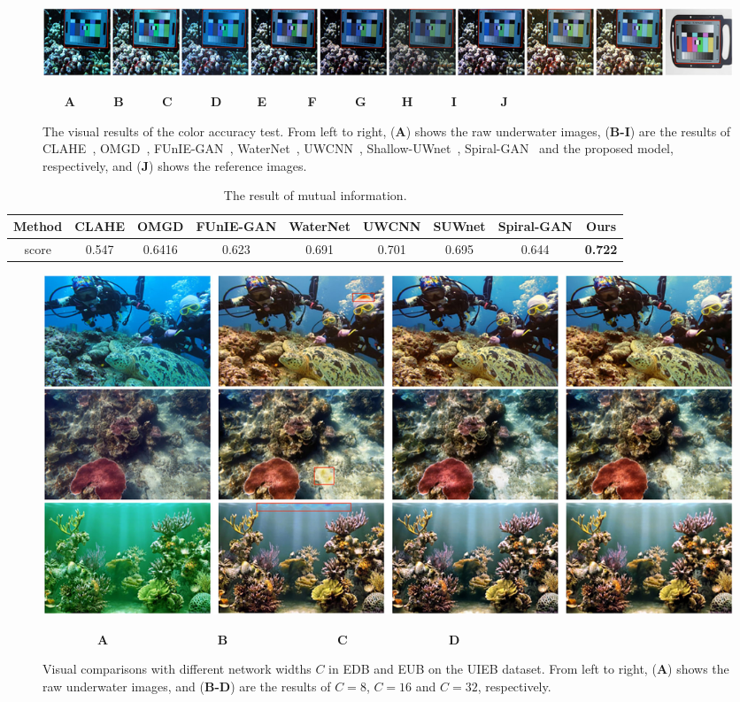 \documentclass[utf8]{FrontiersinHarvard} %
\begin{document}
\begin{figure}[htbp]
\begin{center}
\includegraphics[width=1\textwidth]{FSpiralGAN_frontiers/onepicture/color_card300.jpg}
\end{center}
$~~~~~~~~$\textbf{A}$~~~~~~~~~~~~~~$\textbf{B}$~~~~~~~~~~~~~~$\textbf{C}$~~~~~~~~~~~~~~$\textbf{D}$~~~~~~~~~~~~~$\textbf{E}$~~~~~~~~~~~~~~~$\textbf{F}$~~~~~~~~~~~~~~$\textbf{G}$~~~~~~~~~~~~~$\textbf{H}$~~~~~~~~~~~~~~$\textbf{I}$~~~~~~~~~~~~~~~~$\textbf{J}
 \caption{The visual results of the color accuracy test. From left to right, (\textbf{A}) shows the raw underwater images, (\textbf{B-I}) are the results of CLAHE~\citep{109340}, OMGD~\citep{ren2021online}, FUnIE-GAN~\citep{9001231}, WaterNet~\citep{8917818}, UWCNN~\citep{2019Underwater1}, Shallow-UWnet~\citep{naik2021shallow}, Spiral-GAN~\citep{2020Underwater} and the proposed model, respectively, and (\textbf{J}) shows the reference images.\label{fig:colorcard}}
\end{figure}

\begin{table}[htbp]\normalsize
\setlength\tabcolsep{4pt}
\centering
\caption{The result of mutual information.}
\begin{tabular}{c|cccccccc}
\hline  
Method&CLAHE&OMGD&FUnIE-GAN&WaterNet&UWCNN&SUWnet&Spiral-GAN&Ours\\
\hline 
score&0.547&0.6416&0.623&0.691&0.701&0.695&0.644&\textbf{0.722}\\ 
\hline
\end{tabular}
\label{tbl:colorcard}
\end{table}

\begin{figure}[htbp]
\begin{center}
\includegraphics[width=1\textwidth]{FSpiralGAN_frontiers/onepicture/abalation_channel300.jpg}
\end{center}
$~~~~~~~~~~~~~~~~~~~~$\textbf{A}$~~~~~~~~~~~~~~~~~~~~~~~~~~~~~~~~~~~~~~~~$\textbf{B}$~~~~~~~~~~~~~~~~~~~~~~~~~~~~~~~~~~~~~~~~$\textbf{C}$~~~~~~~~~~~~~~~~~~~~~~~~~~~~~~~~~~~~~$\textbf{D}
 \caption{Visual comparisons with different network widths $C$ in EDB and EUB on the UIEB dataset. From left to right, (\textbf{A}) shows the raw underwater images, and (\textbf{B-D}) are the results of $C=8$, $C=16$ and $C=32$, respectively. \label{fig:ablationchannel-UIEBD}}
\end{figure}
\end{document}
